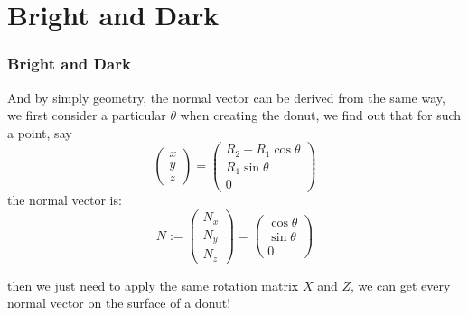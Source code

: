 \documentclass[12pt, t]{beamer}
\begin{document}
\section{Bright and Dark}
\begin{frame}
    \frametitle{Bright and Dark}

    And by simply geometry, the normal vector can be derived from the same way, we first consider a
    particular $\theta$ when creating the donut, we find out that for such a point, say
    \begin{equation*}
        \begin{pmatrix}
        x   \\
        y   \\
        z
        \end{pmatrix}
        =
        \begin{pmatrix}
            R_2 + R_1\cos{\theta} \\
            R_1\sin{\theta} \\
            0
        \end{pmatrix}
    \end{equation*}
    the normal vector is:
    \begin{equation*}
        N :=
        \begin{pmatrix}
            N_x \\
            N_y \\
            N_z
        \end{pmatrix}
        =
        \begin{pmatrix}
            \cos\theta  \\
            \sin\theta  \\
            0
        \end{pmatrix}
    \end{equation*}

    then we just need to apply the same rotation matrix $X$ and $Z$, we can get every normal vector
    on the surface of a donut!

\end{frame}

\end{document}
